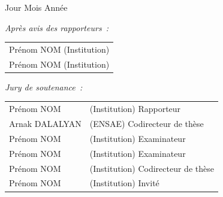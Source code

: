 \documentclass[a4paper,12pt]{book}
\begin{document}
\vspace{10mm}

 Jour Mois Ann\'ee

\vspace{5mm}

\noindent
{\small \it Apr\`es avis des rapporteurs~: }
\begin{tabular}{l} {\sc Pr\'enom NOM} (Institution)\vspace{1mm}  \\
{\sc  Pr\'enom NOM} (Institution)\\
\end{tabular}

\vspace{8mm}

\noindent
{\small \it Jury de soutenance~: }
\begin{tabular}{ll}
{\sc   Pr\'enom NOM}&(Institution) {\small Rapporteur}\vspace{1mm}\\
{\sc   Arnak DALALYAN}&(ENSAE) {\small Codirecteur de th\`ese}\vspace{1mm}\\
{\sc   Pr\'enom NOM}&(Institution) {\small Examinateur}\vspace{1mm}\\
{\sc   Pr\'enom NOM}&(Institution) {\small Examinateur}\vspace{1mm}\\
{\sc   Pr\'enom NOM}&(Institution) {\small Codirecteur de th\`ese}\vspace{1mm}\\
{\sc   Pr\'enom NOM}&(Institution) {\small Invit\'e}\vspace{1mm}\\
\end{tabular}
\end{document}
